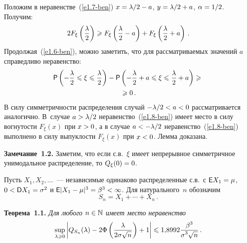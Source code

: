 \begin{multicols}{2}
\begin{equation}
\label{e1.7-ben}
\end{equation}
Положим в  неравенстве~(\ref{e1.7-ben}) $x\hm=\lambda/2\hm-a$, $y\hm=\lambda/2\hm+a$,
$\alpha\hm=1/2$. Получим:
$$
2F_{\xi}\left(\displaystyle\frac{\displaystyle \lambda\mathstrut}{\displaystyle 2\mathstrut}\right)\geqslant
F_{\xi}\left(\displaystyle\frac{\displaystyle \lambda\mathstrut}{\displaystyle 2\mathstrut}-a\right)+
F_{\xi}\left(\displaystyle\frac{\displaystyle \lambda\mathstrut}{\displaystyle 2\mathstrut}+a\right)\,.
$$
Продолжая~(\ref{e1.6-ben}), можно заметить, что для рас\-смат\-ри\-ва\-емых значений
$a$ справедливо неравенство:
\begin{multline}
{\sf P}\left(-\displaystyle\frac{\displaystyle \lambda\mathstrut}{\displaystyle 2\mathstrut}\leqslant \xi\leqslant \frac{\lambda}{2}\right)-{\sf
P}\left(-\displaystyle\frac{\displaystyle \lambda\mathstrut}{\displaystyle 2\mathstrut}+a\leqslant \xi\leqslant \displaystyle\frac{\displaystyle \lambda\mathstrut}{\displaystyle 2\mathstrut}+a\right)\geqslant{}\\
{}\geqslant
0\,.\label{e1.8-ben}
\end{multline}
В силу симметричности распределения случай $-\lambda/2\hm<a\hm<0$
рассматривается аналогично. В~случае $a\hm>\lambda/2$ неравенство~(\ref{e1.8-ben})
имеет место в силу вогнутости $F_{\xi}(x)$ при $x\hm>0$, а в случае $a\hm<-\lambda/2$ 
неравенство~(\ref{e1.8-ben}) выполнено в силу выпуклости
$F_{\xi}(x)$ при $x\hm<0$. Лемма доказана.

\smallskip

\noindent
\textbf{Замечание~1.2.} Заметим, что если  с.в.~$\xi$  имеет
непрерывное симметричное унимодальное распределение, то
$Q_{\xi}(0)\hm=0$.

\smallskip

Пусть $X_1,X_2,\ldots$~--- независимые одинаково распределенные
с.в.\ с ${\sf E}X_1\hm=\mu$, $0\hm<{\sf D}X_1\hm=\sigma^2$ и
${\sf E}|X_1\hm-\mu|^3\hm=\beta^3\hm<\infty$. Для натурального~$n$ обозначим
$$
S_n=X_1+\cdots+X_n\,.
$$

\smallskip

\noindent
\textbf{Теорема~1.1.} \textit{Для любого $n\in\mathbb N$ имеет место неравенство}
$$
\sup\limits_{\lambda\geqslant0}\left\vert Q_{S_n}(\lambda)-
2\Phi\left(\displaystyle\frac{\displaystyle \lambda\mathstrut}{\displaystyle 2\sigma\sqrt{n}\mathstrut}\right)+1\right\vert\leqslant 1{,}8992
\displaystyle\frac{\displaystyle \beta^3\mathstrut}{\displaystyle \sigma^3\sqrt{n}\mathstrut}\,.
$$

\smallskip


\end{multicols}
